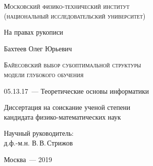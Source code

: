 \thispagestyle{empty}


\begin{titlepage}
\begin{center}
\textsc{Московский физико-технический институт \\ (национальный исследовательский университет)}\\
\end{center}
\vspace{1.5cm}
\begin{flushright}
{На правах рукописи}
\end{flushright}
\vspace{1.5cm}
\begin{center}
{Бахтеев Олег Юрьевич}
\par
\vspace{2cm}
\textsc{Байесовский выбор субоптимальной структуры
\\модели глубокого обучения }
\par
\vspace{2cm}
{05.13.17~--- Теоретические основы информатики}
\par
\vspace{2cm}
{Диссертация на соискание ученой степени\\
кандидата физико-математических наук}
\end{center}
\vspace{2cm}
\hfill\parbox{8,4cm}{Научный руководитель:
\\д.ф.-м.н. В.\,В.\,Стрижов}
\par
\vspace{3.5cm}
\begin{center}
{Москва~--- 2019}
\end{center}
\end{titlepage}



\newpage{}
